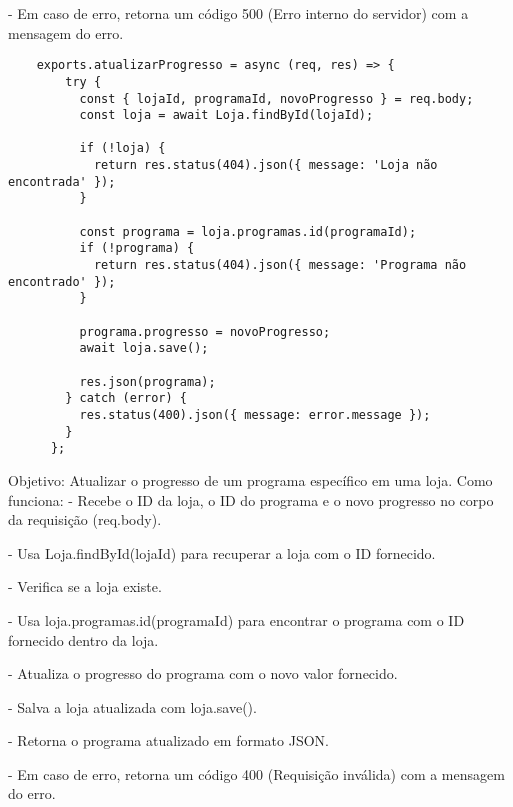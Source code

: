 - Em caso de erro, retorna um código 500 (Erro interno do servidor) com a mensagem do erro.

\vspace{1cm}
\begin{lstlisting}
    exports.atualizarProgresso = async (req, res) => {
        try {
          const { lojaId, programaId, novoProgresso } = req.body;
          const loja = await Loja.findById(lojaId);
          
          if (!loja) {
            return res.status(404).json({ message: 'Loja não encontrada' });
          }
      
          const programa = loja.programas.id(programaId);
          if (!programa) {
            return res.status(404).json({ message: 'Programa não encontrado' });
          }
      
          programa.progresso = novoProgresso;
          await loja.save();
          
          res.json(programa);
        } catch (error) {
          res.status(400).json({ message: error.message });
        }
      };
\end{lstlisting}
\vspace{1cm}

Objetivo: Atualizar o progresso de um programa específico em uma loja.
Como funciona:
- Recebe o ID da loja, o ID do programa e o novo progresso no corpo da requisição (req.body).


- Usa Loja.findById(lojaId) para recuperar a loja com o ID fornecido.

- Verifica se a loja existe.

- Usa loja.programas.id(programaId) para encontrar o programa com o ID fornecido dentro da loja.

- Atualiza o progresso do programa com o novo valor fornecido.

- Salva a loja atualizada com loja.save().

- Retorna o programa atualizado em formato JSON.

- Em caso de erro, retorna um código 400 (Requisição inválida) com a mensagem do erro.

















